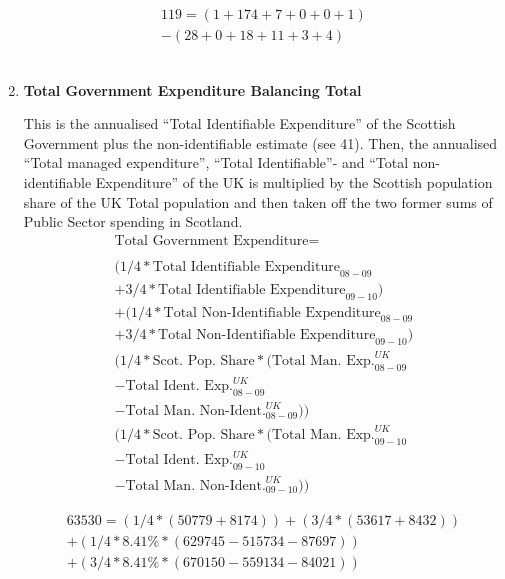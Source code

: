 \begin{enumerate}
\begin{equation} \nonumber
\begin{split}
119 = (1+174+7+0+0+1)\\
-(28+0+18+11+3+4)
\end{split}
\end{equation}\\


\item \textbf {Total Government Expenditure Balancing Total}

This is the annualised “Total Identifiable Expenditure” of the Scottish Government plus the non-identifiable estimate (see 41). Then, the annualised “Total managed expenditure”, “Total Identifiable”- and “Total non-identifiable Expenditure” of the UK is multiplied by the Scottish population share of the UK Total population and then taken off the two former sums of Public Sector spending in Scotland. \cite{HMTR2012,ONS2011a}\\

\begin{equation}
\begin{split}
\text{Total Government Expenditure} =  \\ \\
(1/4 * \text{Total Identifiable Expenditure}_{08-09} \\
+ 3/4 * \text{Total Identifiable Expenditure}_{09-10})\\
+ (1/4 * \text{Total Non-Identifiable Expenditure}_{08-09} \\
+ 3/4 * \text{Total Non-Identifiable Expenditure}_{09-10}) \\
( 1/4 * \text{Scot. Pop. Share} * ( \text{Total Man. Exp.}^{UK}_{08-09} \\
- \text{Total Ident. Exp.}^{UK}_{08-09} \\
- \text{Total Man. Non-Ident.}^{UK}_{08-09})) \\
( 1/4 * \text{Scot. Pop. Share} * ( \text{Total Man. Exp.}^{UK}_{09-10} \\
- \text{Total Ident. Exp.}^{UK}_{09-10} \\
- \text{Total Man. Non-Ident.}^{UK}_{09-10}))
\end{split} \label{eq:2.5.47}
\end{equation}


\begin{equation} \nonumber
\begin{split}
63530 = (1/4*(50779+8174))+(3/4*(53617+8432))\\
+(1/4*8.41\%*(629745-515734-87697))\\
+(3/4*8.41\%*(670150-559134-84021))
\end{split}
\end{equation}\\



\end{enumerate}
